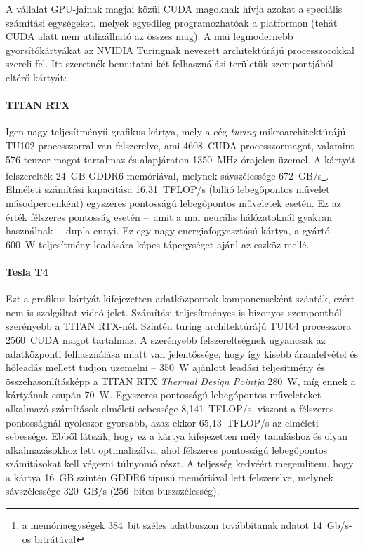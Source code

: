 A vállalat GPU-jainak magjai közül CUDA magoknak hívja azokat a speciális számítási egységeket, melyek egyedileg programozhatóak a platformon (tehát CUDA alatt nem utilizálható az összes mag). A mai legmodernebb gyorsítókártyákat az NVIDIA Turingnak nevezett architektúrájú processzorokkal szereli fel. Itt szeretnék bemutatni két felhasználási területük szempontjából eltérő kártyát:\cite{spec:titan-rtx}\cite{spec:tesla-t4}
\paragraph{TITAN RTX}
Igen nagy teljesítményű grafikus kártya, mely a cég \emph{turing} mikroarchitektúrájú TU102 processzorral van felszerelve, ami 4608~CUDA processzormagot, valamint 576 tenzor magot tartalmaz és alapjáraton 1350~MHz órajelen üzemel. A kártyát felszerelték 24~GB GDDR6 memóriával, melynek sávszélessége 672~GB/s\footnote{a memóriaegységek 384~bit széles adatbuszon továbbítanak adatot 14~Gb/s-os bitrátával}. Elméleti számítási kapacitása 16.31~TFLOP/s (billió lebegőpontos művelet másodpercenként) egyszeres pontosságú lebegőpontos műveletek esetén. Ez az érték félszeres pontosság esetén --~amit a mai neurális hálózatoknál gyakran használnak~-- dupla ennyi. Ez egy nagy energiafogyasztású kártya, a gyártó 600~W teljesítmény leadására képes tápegységet ajánl az eszköz mellé.

\paragraph{Tesla T4}
Ezt a grafikus kártyát kifejezetten adatközpontok komponenseként szánták, ezért nem is szolgáltat videó jelet. Számítási teljesítményes is bizonyos szempontból szerényebb a TITAN RTX-nél. Szintén turing architektúrájú TU104 processzora 2560~CUDA magot tartalmaz. A szerényebb felszereltségnek ugyancsak az adatközponti felhasználása miatt van jelentőssége, hogy így kisebb áramfelvétel és hőleadás mellett tudjon üzemelni -- 350~W ajánlott leadási teljesítmény és összehasonlításképp a TITAN RTX \emph{Thermal Design Pointja} 280~W, míg ennek a kártyának csupán 70~W. Egyszeres pontosságú lebegópontos műveleteket alkalmazó számítások elméleti sebessége 8,141~TFLOP/s, viszont a félszeres pontosságnál nyolcszor gyorsabb, azaz ekkor 65,13~TFLOP/s az elméleti sebessége. Ebből látszik, hogy ez a kártya kifejezetten mély tanuláshoz és olyan alkalmazásokhoz lett optimalizálva, ahol félszeres pontosságú lebegőpontos számításokat kell végezni túlnyomó részt. A teljesség kedvéért megemlítem, hogy a kártya 16~GB szintén GDDR6 típusú memóriával lett felszerelve, melynek sávszélessége 320~GB/s (256~bites buszszélesség).

